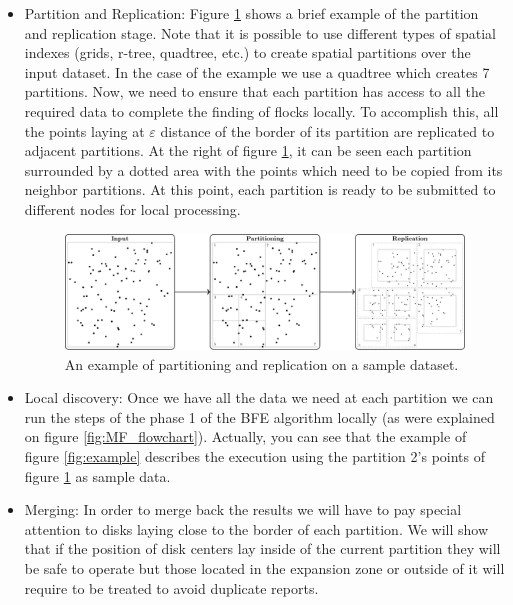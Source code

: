 \begin{itemize}

\item Partition and Replication: Figure \ref{fig:partrep} shows a brief example of the partition and replication stage.  Note that it is possible to use different types of spatial indexes (grids, r-tree, quadtree, etc.) to create spatial partitions over the input dataset.  In the case of the example we use a quadtree which creates 7 partitions.  Now, we need to ensure that each partition has access to all the required data to complete the finding of flocks locally.  To accomplish this, all the points laying at $\varepsilon$ distance of the border of its partition are replicated to adjacent partitions.  At the right of figure \ref{fig:partrep},  it can be seen each partition surrounded by a dotted area with the points which need to be copied from its neighbor partitions.  At this point, each partition is ready to be submitted to different nodes for local processing.

\begin{figure}[!ht]
    \centering
    \includegraphics[width=\textwidth]{figures/MF_stages/P123}
    \caption{An example of partitioning and replication on a sample dataset.}\label{fig:partrep}
\end{figure}

\item Local discovery: Once we have all the data we need at each partition we can run the steps of the phase 1 of the BFE algorithm locally (as were explained on figure \ref{fig:MF_flowchart}).  Actually, you can see that the example of figure \ref{fig:example} describes the execution using the partition 2's points of figure \ref{fig:partrep} as sample data.

\item Merging:  In order to merge back the results we will have to pay special attention to disks laying close to the border of each partition.  We will show that if the position of disk centers lay inside of the current partition they will be safe to operate but those located in the expansion zone or outside of it will require to be treated to avoid duplicate reports.  


\end{itemize}
